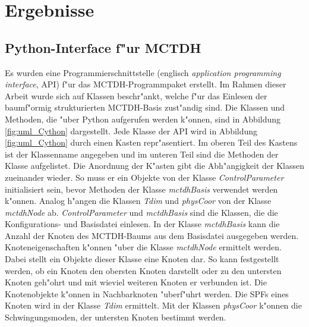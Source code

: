 \chapter{Ergebnisse}

\section{Python-Interface f"ur MCTDH}
\label{sec:PyInterface}


Es wurden eine Programmierschnittstelle (englisch \textit{application programming interface}, API) f"ur das MCTDH-Programmpaket erstellt.
Im Rahmen dieser Arbeit wurde sich auf Klassen beschr"ankt, welche f"ur das Einlesen der baumf"ormig strukturierten MCTDH-Basis zust"andig sind.
Die Klassen und Methoden, die "uber Python aufgerufen werden k"onnen, sind in Abbildung \ref{fig:uml_Cython} dargestellt. 
Jede Klasse der API wird in Abbildung \ref{fig:uml_Cython} durch einen Kasten repr"asentiert. Im oberen Teil des Kastens ist der Klassenname
angegeben und im unteren Teil sind die Methoden der Klasse aufgelistet. Die Anordnung der K"asten gibt die Abh"angigkeit der Klassen zueinander wieder.
So muss er ein Objekte von der Klasse \textit{ControlParameter} initialisiert sein, bevor Methoden der Klasse
\textit{mctdhBasis} verwendet werden k"onnen. Analog h"angen die Klassen \textit{Tdim} und \textit{physCoor} von der Klasse
\textit{mctdhNode} ab.
\textit{ControlParameter} und \textit{mctdhBasis} sind die Klassen, die die Konfigurations- und Basisdatei einlesen. 
In der Klasse \textit{mctdhBasis} kann die Anzahl der Knoten des MCTDH-Baums aus dem Basisdatei ausgegeben werden.
Knoteneigenschaften k"onnen "uber die Klasse \textit{mctdhNode}  ermittelt werden. Dabei stellt ein Objekte dieser Klasse
eine Knoten dar.
So kann festgestellt werden, ob ein Knoten den obersten Knoten darstellt oder zu den untersten Knoten geh"ohrt und mit wieviel weiteren Knoten er verbunden ist.
Die Knotenobjekte k"onnen in Nachbarknoten "uberf"uhrt werden.
Die SPFs eines Knoten wird in der Klasse \textit{Tdim} ermittelt. Mit der Klassen \textit{physCoor} k"onnen
die Schwingungsmoden, der untersten Knoten bestimmt werden. 


